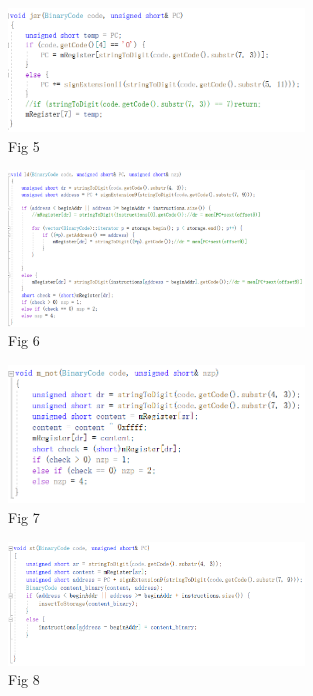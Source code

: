 \documentclass[twoside]{article}
\begin{document}
\begin{CJK*}{UTF8}{gbsn}
	
	\begin{figure}[htbp]
		\small
		\centering
		\includegraphics[width=0.7\textwidth]{jsr.png}
		\caption{Fig 5} %
	\end{figure}

	
	\begin{figure}[htbp]
		\small
		\centering
		\includegraphics[width=0.7\textwidth]{load.png}
		\caption{Fig 6} %
	\end{figure}

	
	\begin{figure}[htbp]
		\small
		\centering
		\includegraphics[width=0.7\textwidth]{not.png}
		\caption{Fig 7} %
	\end{figure}


	\begin{figure}[htbp]
		\small
		\centering
		\includegraphics[width=0.7\textwidth]{store.png}
		\caption{Fig 8} %
	\end{figure}
	


\end{CJK*}
\end{document}
